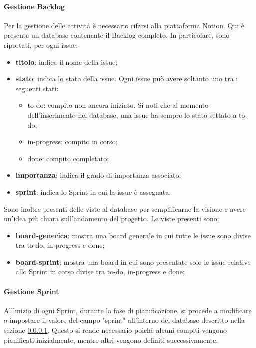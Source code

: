         \paragraph{Gestione Backlog} \label{sec:gestione-backlog}
        Per la gestione delle attività è necessario rifarsi alla piattaforma Notion.
        Qui è presente un database contenente il Backlog completo. 
        In particolare, sono riportati, per ogni issue:
        \begin{itemize}
            \item \textbf{titolo}: indica il nome della issue;
            \item \textbf{stato}: indica lo stato della issue. Ogni issue può avere soltanto uno tra i seguenti stati: 
            \begin{itemize}
                \item to-do: compito non ancora iniziato. Si noti che al momento dell'inserimento nel database, una issue ha sempre lo stato settato a to-do;
                \item in-progress: compito in corso;
                \item done: compito completato;
            \end{itemize}
            \item \textbf{importanza}: indica il grado di importanza associato;
            \item \textbf{sprint}: indica lo Sprint in cui la issue è assegnata. 
        \end{itemize} 

        \vspace{0.3cm}
        \noindent
        Sono inoltre presenti delle viste al database per semplificarne la visione e avere un'idea più chiara sull'andamento del progetto. Le viste presenti sono:
        \begin{itemize}
            \item \textbf{board-generica}: mostra una board generale in cui tutte le issue sono divise tra to-do, in-progress e done;
            \item \textbf{board-sprint}: mostra una board in cui sono presentate solo le issue relative allo Sprint in corso divise tra to-do, in-progress e done;
        \end{itemize}

        \paragraph{Gestione Sprint} \label{sec:gestione-sprint}
        All'inizio di ogni Sprint, durante la fase di pianificazione, si procede a modificare o impostare il valore del campo "sprint" all'interno del database descritto nella sezione \ref{sec:gestione-backlog}. Questo si rende necessario poichè alcuni compiti vengono pianificati inizialmente, mentre altri vengono definiti successivamente.
        
